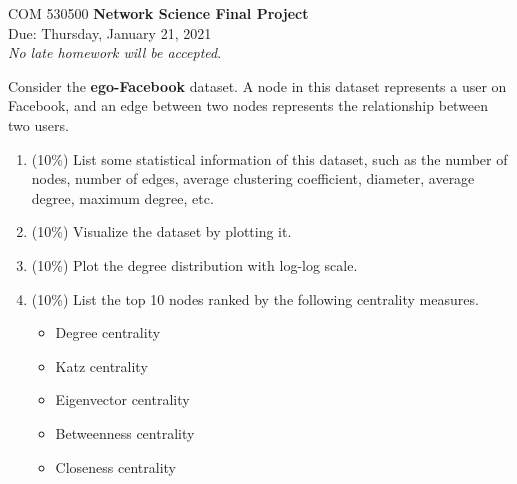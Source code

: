 \documentclass[12pt]{article}
\begin{document}
\thispagestyle{empty}
\begin{center}
{\Large \noindent COM 530500 {\bf Network Science Final Project} \\
\large {{\sc Due:} Thursday, January 21, 2021}  \\
}
\emph{No late homework will be accepted}.
\end{center}





\bigskip



 Consider the {\bf ego-Facebook} \cite{leskovec2012learning} dataset. A node in this dataset represents a user on Facebook, and an edge between two nodes represents the relationship between two users.
\begin{enumerate}[label=(\alph*)]
	\item (10\%) List some statistical information of this dataset, such as the number of nodes, number of edges, average clustering coefficient, diameter, average degree, maximum degree, etc.
	\item (10\%) Visualize the dataset by plotting it.
	\item (10\%) Plot the degree distribution with log-log scale.
	\item (10\%) List the top 10 nodes ranked by the following centrality measures.
	\begin{itemize}
		\item Degree centrality
		\item Katz centrality
		\item Eigenvector centrality
		\item Betweenness centrality
		\item Closeness centrality
	\end{itemize}
\end{enumerate}
\end{document}
